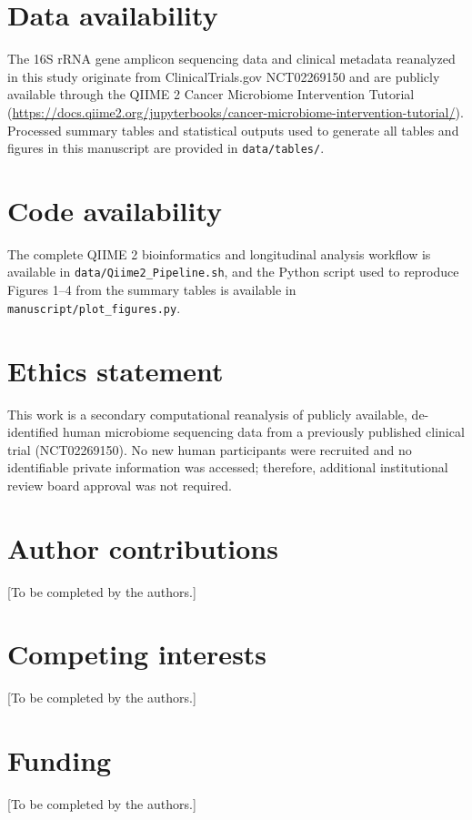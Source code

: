 
\section*{Data availability}
The 16S rRNA gene amplicon sequencing data and clinical metadata reanalyzed in this study originate from ClinicalTrials.gov NCT02269150 and are publicly available through the QIIME 2 Cancer Microbiome Intervention Tutorial (\url{https://docs.qiime2.org/jupyterbooks/cancer-microbiome-intervention-tutorial/}). Processed summary tables and statistical outputs used to generate all tables and figures in this manuscript are provided in \texttt{data/tables/}.

\section*{Code availability}
The complete QIIME 2 bioinformatics and longitudinal analysis workflow is available in \texttt{data/Qiime2\_Pipeline.sh}, and the Python script used to reproduce Figures 1--4 from the summary tables is available in \texttt{manuscript/plot\_figures.py}.

\section*{Ethics statement}
This work is a secondary computational reanalysis of publicly available, de-identified human microbiome sequencing data from a previously published clinical trial (NCT02269150). No new human participants were recruited and no identifiable private information was accessed; therefore, additional institutional review board approval was not required.

\section*{Author contributions}
[To be completed by the authors.]

\section*{Competing interests}
[To be completed by the authors.]

\section*{Funding}
[To be completed by the authors.]

